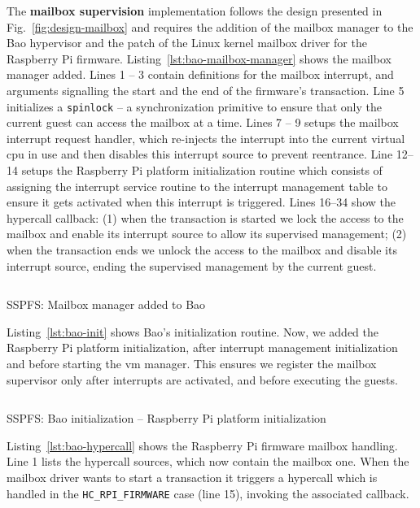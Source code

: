 The \textbf{mailbox supervision} implementation follows the design presented in
Fig.~\ref{fig:design-mailbox} and requires the addition of the
mailbox manager to the Bao hypervisor and the patch of the Linux kernel
mailbox driver for the Raspberry Pi firmware. Listing~\ref{lst:bao-mailbox-manager}
shows the mailbox manager added. Lines 1 -- 3 contain definitions for the
mailbox interrupt, and arguments signalling the start and the end of the
firmware's transaction. Line 5 initializes a \texttt{spinlock} -- a
synchronization primitive to ensure that only the current guest can access the
mailbox at a time. Lines 7 -- 9 setups the mailbox interrupt request handler,
which re-injects the interrupt into the current virtual \gls{cpu} in use and
then disables this interrupt source to prevent reentrance. Line 12--14 setups
the Raspberry Pi platform initialization routine which consists of assigning the
interrupt service routine to the interrupt management table to ensure it gets
activated when this interrupt is triggered. Lines 16--34 show the hypercall
callback: (1) when the transaction is started we lock the access to the mailbox
and enable its interrupt source to allow its supervised management; (2) when the
transaction ends we unlock the access to the mailbox and disable its interrupt
source, ending the supervised management by the current guest.

\begin{longlisting}
\centering
\inputminted[]{c}{./listing/rpi_firmware.c}
\caption{SSPFS: Mailbox manager added to Bao}
\label{lst:bao-mailbox-manager}
\end{longlisting}


Listing~\ref{lst:bao-init} shows Bao's initialization routine. Now, we added the
Raspberry Pi platform initialization, after interrupt management initialization
and before starting the \gls{vm} manager. This ensures we register the mailbox
supervisor only after interrupts are activated, and before executing the guests.

\begin{longlisting}
\centering
\inputminted[]{c}{./listing/init.c}
\caption{SSPFS: Bao initialization -- Raspberry Pi platform initialization}
\label{lst:bao-init}
\end{longlisting}

Listing~\ref{lst:bao-hypercall} shows the Raspberry Pi firmware mailbox
handling. Line 1 lists the hypercall sources, which now contain the mailbox
one. When the mailbox driver wants to start a transaction it triggers a
hypercall which is handled in the \lstinline{HC_RPI_FIRMWARE} case (line 15), invoking the
associated callback.


